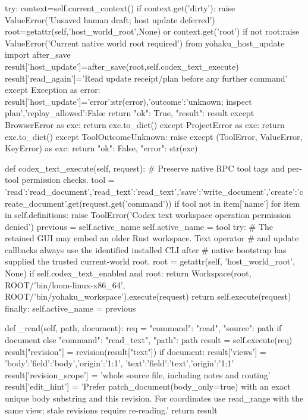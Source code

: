                 try:
                    context=self.current_context()
                    if context.get('dirty'):
                        raise ValueError('Unsaved human draft; host update deferred')
                    root=getattr(self,'host_world_root',None) or context.get('root')
                    if not root:raise ValueError('Current native world root required')
                    from yohaku_host_update import after_save
                    result['host_update']=after_save(root,self.codex_text_execute)
                    result['read_again']='Read update receipt/plan before any further command'
                except Exception as error:
                    result['host_update']={'error':str(error),'outcome':'unknown; inspect plan','replay_allowed':False}
            return {"ok": True, "result": result}
        except BrowserError as exc:
            return exc.to_dict()
        except ProjectError as exc:
            return exc.to_dict()
        except ToolOutcomeUnknown:
            raise
        except (ToolError, ValueError, KeyError) as exc:
            return {"ok": False, "error": str(exc)}

    def codex_text_execute(self, request):
        # Preserve native RPC tool tags and per-tool permission checks.
        tool = {'read':'read_document','read_text':'read_text','save':'write_document','create':'create_document'}.get(request.get('command'))
        if tool not in {item['name'] for item in self.definitions}:
            raise ToolError('Codex text workspace operation permission denied')
        previous = self.active_name
        self.active_name = tool
        try:
            # The retained GUI may embed an older Rust workspace. Text operator
            # and update callbacks always use the identified installed CLI after
            # native bootstrap has supplied the trusted current-world root.
            root = getattr(self, 'host_world_root', None)
            if self.codex_text_enabled and root:
                return Workspace(root, ROOT/'bin/loom-linux-x86_64', ROOT/'bin/yohaku_workspace').execute(request)
            return self.execute(request)
        finally: self.active_name = previous

    def _read(self, path, document):
        req = {"command": "read", "source": path} if document else {"command": "read_text", "path": path}
        result = self.execute(req)
        result["revision"] = revision(result["text"])
        if document:
            result['views'] = {'body':{'field':'body','origin':'1:1'},
                               'text':{'field':'text','origin':'1:1'}}
            result['revision_scope'] = 'whole source file, including notes and routing'
            result['edit_hint'] = 'Prefer patch_document(body_only=true) with an exact unique body substring and this revision. For coordinates use read_range with the same view; stale revisions require re-reading.'
        return result

